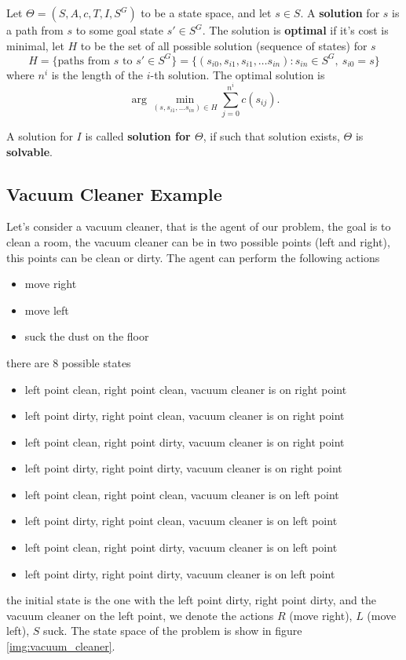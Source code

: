 \documentclass[10pt, letterpaper]{report}
\begin{document}
\begin{definition}
    Let $\Theta=(S,A,c,T,I,S^G)$ to be a state space, and let $s\in S$. A \textbf{solution} for $s$ is a path from $s$ to some goal state $s'\in S^G$. The solution is \textbf{optimal} if it's cost is minimal, let $H$ to be the set of all possible solution (sequence of states) for $s$\begin{equation}
        H=\{\text{paths from }s\text{ to }s'\in S^G\}=\{(s_{i0},s_{i1},s_{i1},\dots s_{in})  : s_{in}\in S^G, \ s_{i0}=s\}
    \end{equation}
    where $n^i$ is the length of the $i$-th solution.
    The optimal solution is\begin{equation}
        \arg \min_{(s,s_{i1},\dots s_{in})\in H}\sum_{j=0}^{n^i} c(s_{ij}).
    \end{equation}
\end{definition}
A solution for $I$ is called \textbf{solution for $\Theta$}, if such that solution exists, $\Theta$ is \textbf{solvable}.
\subsection{Vacuum Cleaner Example}
Let's consider a vacuum cleaner, that is the agent of our problem, the goal is to clean a room, the vacuum cleaner can be in two possible points (left and right), this points can be clean or dirty. The agent can perform the following actions\begin{itemize}
    \item move right 
    \item move left 
    \item suck the dust on the floor
\end{itemize}
there are 8 possible states\begin{itemize}
    \item left point clean, right point clean, vacuum cleaner is on right point
    \item left point dirty, right point clean, vacuum cleaner is on right point
    \item left point clean, right point dirty, vacuum cleaner is on right point
    \item left point dirty, right point dirty, vacuum cleaner is on right point
    \item left point clean, right point clean, vacuum cleaner is on left point
    \item left point dirty, right point clean, vacuum cleaner is on left point
    \item left point clean, right point dirty, vacuum cleaner is on left point
    \item left point dirty, right point dirty, vacuum cleaner is on left point
\end{itemize}
the initial state is the one with the left point dirty, right point dirty, and the vacuum cleaner on the left point, we denote the actions $R$ (move right), $L$ (move left), $S$ suck. The state space of the problem is show in figure \ref{img:vacuum_cleaner}. 
\end{document}
